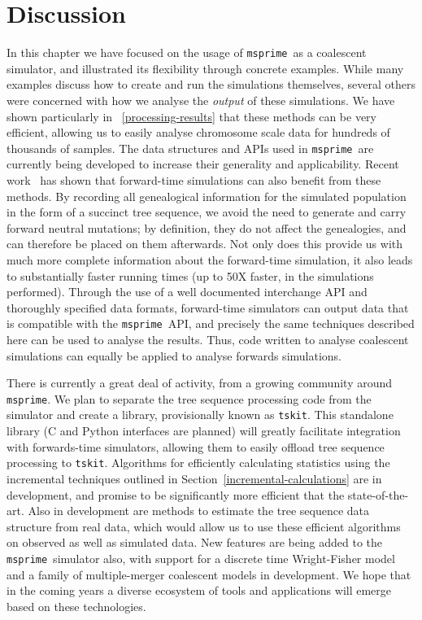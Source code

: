 \documentclass[graybox]{svmult}
\newcommand{\msprime}[0]{\texttt{msprime}}
\begin{document}
\section{Discussion}
\label{sec:discussion}
In this chapter we have focused on the usage of \msprime\ as a coalescent
simulator, and illustrated its flexibility through concrete examples.
While many examples discuss how to create and run the simulations themselves,
several others were concerned with how we analyse the \emph{output} of
these simulations. We have shown particularly in ~\ref{processing-results}
that these methods can be very efficient, allowing us to easily analyse
chromosome scale data for hundreds of thousands of samples.
The data structures and APIs used in \msprime\ are
currently being developed to increase their generality
and applicability. Recent work~\citep{kelleher2018efficient} has shown
that forward-time simulations can also benefit from these methods. By
recording all genealogical information for the simulated population
in the form of a succinct tree sequence,
we avoid the need to generate and carry forward neutral mutations;
by definition, they do not affect the genealogies, and can therefore
be placed on them afterwards. Not only does
this provide us with much more complete information about the forward-time
simulation, it also leads to substantially faster running times
(up to 50X faster, in the simulations performed). Through the use
of a well documented interchange API and thoroughly specified
data formats, forward-time simulators can output data that
is compatible with the \msprime\ API, and precisely the same
techniques described here can be used to analyse the results.
Thus, code written to analyse coalescent simulations can equally
be applied to analyse forwards simulations.

There is currently a great deal of activity, from a growing community
around \msprime. We plan to separate the tree sequence processing code
from the simulator and create a library, provisionally known
as \texttt{tskit}. This standalone library (C and Python interfaces
are planned) will greatly facilitate integration with
forwards-time simulators, allowing them to easily offload
tree sequence processing to \texttt{tskit}. Algorithms for efficiently
calculating statistics using the incremental techniques outlined
in Section~\ref{incremental-calculations} are in development, and
promise to be significantly more efficient that the state-of-the-art.
Also in development are methods to estimate the tree sequence data
structure from real data, which would allow us to use these
efficient algorithms on observed as well as simulated data. New
features are being added to the \msprime\ simulator also, with
support for a discrete time Wright-Fisher model and a family of
multiple-merger coalescent models in development. We hope that
in the coming years a diverse ecosystem of tools and applications
will emerge based on these technologies.


\end{document}

